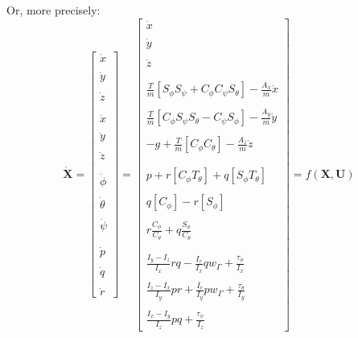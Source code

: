 Or, more precisely:
$$
\dot{\boldsymbol{X}} = 
\left[
\begin{array}{c}
\dot{x} \\
{}\\
\dot{y} \\
{}\\
\dot{z} \\
{}\\
{}\\
\ddot{x} \\
{}\\
\ddot{y} \\
{}\\
\ddot{z} \\
{}\\
{}\\
\dot{\phi} \\
{}\\
\dot{\theta} \\
{}\\
\dot{\psi} \\
{}\\
{}\\
\dot{p} \\
{}\\
\dot{q} \\
{}\\
\dot{r}
\end{array}
\right]
=
\left[
\begin{array}{l}

\dot{x} \\
{}\\
\dot{y} \\
{}\\
\dot{z} \\
{}\\
{}\\
  \frac{T}{m}[S_{\phi} S_{\psi}+C_{\phi} C_{\psi} S_{\theta}] - \frac{A_x}{m} \dot{x} \\
{}\\
  \frac{T}{m}[C_{\phi} S_{\psi} S_{\theta}-C_{\psi} S_{\phi}] - \frac{A_y}{m} \dot{y} \\
{}\\
  -g+\frac{T}{m}[C_{\phi} C_{\theta}] - \frac{A_z}{m} \dot{z} \\
{}\\
{}\\
  p+r[C_{\phi} T_{\theta}]+q[S_{\phi} T_{\theta}] \\
{}\\
  q[C_{\phi}]-r[S_{\phi}] \\
{}\\
  r \frac{C_{\phi}}{C_{\theta}}+q \frac{S_{\phi}}{C_{\theta}} \\
{}\\
{}\\
\frac{I_{y}-I_{z}}{I_{x}} r q - \frac{I_r}{I_{x}} q w_{\Gamma} +\frac{\tau_{\phi}}{I_{x}} \\
{}\\
\frac{I_{z}-I_{x}}{I_{y}} p r + \frac{I_r}{I_{y}} p w_{\Gamma} +\frac{\tau_{\theta}}{I_{y}} \\
{}\\
\frac{I_{x}-I_{y}}{I_{z}} p q +\frac{\tau_{\psi}}{I_{z}}
\end{array}
\right]
=f(\boldsymbol{X}, \boldsymbol{U})
$$

